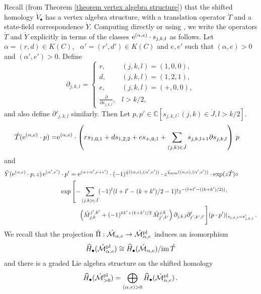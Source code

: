 \documentclass[11pt]{amsart}
\theoremstyle{remark}
\newcommand{\p}{\partial}
\newcommand{\mb}[1]{\mathbb{#1}}
\newcommand{\Mdash}{\acute{\mathcal{M}}}
\newcommand{\Pidash}{\acute{\Pi}}
\newcommand{\im}{\textnormal{im}\,}
\newcommand{\wh}[1]{\widehat{#1}}
\newcommand{\pl}[0]{\textnormal{pl}}
\newcommand{\sym}{\textnormal{sym}}
\newcommand{\ex}{\textnormal{e}}
\numberwithin{theorem}{section}
\begin{document}
Recall (from Theorem \ref{theorem vertex algebra structure}) that the shifted homology $\acute V_\bullet$ has a vertex algebra structure, with a translation operator $\acute{T}$ and a
state-field correspondence $\acute{Y}$.
Computing directly or using \cite[Equation 2.89]{Bu23}, 
we write the operators $\acute{T}$ and $\acute{Y}$ explicitly 
in terms of the classes $\ex^{(\alpha,e)} \cdot s_{j,k,l}$ 
as follows. 
Let $\alpha = (r, d) \in K(C)$, \ $\alpha' = (r', d') \in K (C)$
and $e,e'$ such that $(\alpha,e)>0$ and $(\alpha',e')>0$.
Define
$$
    \partial_{j,k,l} =
    \begin{cases}
        r, & (j, k, l) = (1, 0, 0), \\
        d, & (j, k, l) = (1, 2, 1), \\
        e, & (j, k, l) = ({+}, 0, 0), \\
        \frac{\p}{\p s_{j,k,l}}, & l > k/2,
    \end{cases}
$$
and also define $\p'_{j,k,l}$ similarly. Then
Let $p, p' \in \mb C[s_{j,k,l}:(j,k) \in \acute{J}, l>k/2]$.
\begin{align}
    \acute{T}(\ex^{(\alpha,e)} \cdot p) = 
    & \ex^{(\alpha,e)} \cdot 
    \left( rs_{1,0,1} + ds_{1,2,2} + e s_{+,0,1} + \sum_{(j,k) \in \acute{J}} s_{j,k,l+1} \p s_{j,k,l}
    \right) \, p
\end{align}
and
\begin{align}\label{equation description of Y}
    \nonumber
    \acute{Y}(\ex^{(\alpha,e)} \cdot p,z)\, \ex^{(\alpha',e')} & \cdot p' = 
     \ex^{(\alpha+\alpha',e+e')} \cdot (-1)^{\acute{\chi}((\alpha,e), (\alpha',e'))} \cdot 
    z^{\acute{\chi}_{\sym}((\alpha,e),(\alpha',e'))} \cdot
    \exp(z \acute{T} ) \circ \\
    & \exp \left[ - \sum_{(j,k) \in \acute{J}} (-1)^l ( l+l'-(k+k')/2 -1)! z^{-(l+l'-((k+k')/2))} \cdot \right.\\ 
    \nonumber
    & \quad \qquad \left(
            \acute{M}_{j,k}^{j',k'} +
            (-1)^{kk' + (k+k')/2} \, \acute{M}_{j',k'}^{j,k}
            \right) \p_{j,k,l}\p'_{j',k',l'} \Biggr]
    (p \cdot p') \vert_{s_{j,k,l}= s'_{j,k,l}} \,.
\end{align}
    We recall that the projection $\Pidash: \Mdash_{\alpha,e} \to \Mdash^\pl_{\alpha,e}$ induces an isomorphism 
    $$ \wh{H}_\bullet(\Mdash^\pl_{\alpha,e}) \cong \wh{H}_\bullet(\Mdash_{\alpha,e})/\im \acute{T}$$
    and there is a graded Lie algebra structure on the shifted homology
    $$ \wh{H}_\bullet(\Mdash^\pl_{>0}) =  \bigoplus_{(\alpha,e) >0} \wh{H}_\bullet(\Mdash^\pl_{\alpha,e})\,.$$
\end{document}
